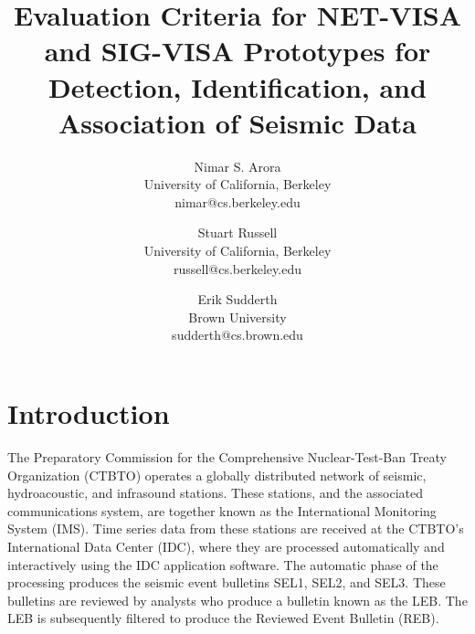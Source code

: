 \documentclass[a4paper,12pt]{article}
\begin{document}
\title{Evaluation Criteria for NET-VISA and SIG-VISA Prototypes for
  Detection, Identification, and Association of Seismic Data}
\author{Nimar S. Arora 
\\University of California, Berkeley \\ nimar@cs.berkeley.edu
\and Stuart Russell 
\\University of California, Berkeley  \\ russell@cs.berkeley.edu
 \and Erik Sudderth \\ Brown University \\ sudderth@cs.brown.edu }
\maketitle


\section{Introduction}

The Preparatory Commission for the Comprehensive Nuclear-Test-Ban Treaty
Organization (CTBTO) operates a globally distributed network of
seismic, hydroacoustic, and infrasound stations. These stations, and
the associated communications system, are together known
as the International Monitoring System (IMS). Time series data from these
stations are received at the CTBTO's International Data Center (IDC),
where they are processed automatically and interactively using the IDC
application software. The automatic phase of the processing produces the
seismic event bulletins SEL1, SEL2, and SEL3. These bulletins are
reviewed by analysts who produce a bulletin known as the LEB. The LEB is
subsequently filtered to produce the Reviewed Event Bulletin (REB).
\end{document}
